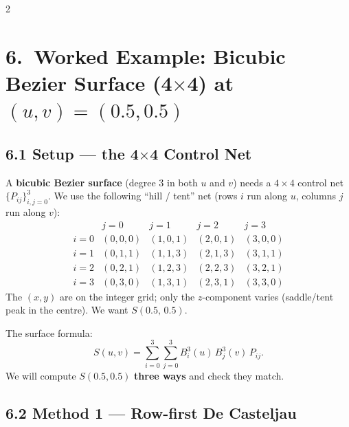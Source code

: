 
\begin{paracol}{2}

\section*{6.\ Worked Example: Bicubic Bezier Surface (4$\times$4) at $(u,v)=(0.5,0.5)$}

\subsection*{6.1 Setup --- the 4$\times$4 Control Net}

A \textbf{bicubic Bezier surface} (degree 3 in both $u$ and $v$) needs a $4\times 4$ control net $\{P_{ij}\}_{i,j=0}^{3}$. We use the following ``hill / tent'' net (rows $i$ run along $u$, columns $j$ run along $v$):
\[
\renewcommand{\arraystretch}{1.1}
\begin{array}{c|cccc}
 & j=0 & j=1 & j=2 & j=3 \\\hline
i{=}0 & (0,0,0) & (1,0,1) & (2,0,1) & (3,0,0) \\
i{=}1 & (0,1,1) & (1,1,3) & (2,1,3) & (3,1,1) \\
i{=}2 & (0,2,1) & (1,2,3) & (2,2,3) & (3,2,1) \\
i{=}3 & (0,3,0) & (1,3,1) & (2,3,1) & (3,3,0)
\end{array}
\]
The $(x,y)$ are on the integer grid; only the $z$-component varies (saddle/tent peak in the centre). We want $S(0.5,\,0.5)$.

The surface formula:
\[
S(u,v)=\sum_{i=0}^{3}\sum_{j=0}^{3} B_i^3(u)\,B_j^3(v)\,P_{ij}.
\]
We will compute $S(0.5,0.5)$ \textbf{three ways} and check they match.

\subsection*{6.2 Method 1 --- Row-first De Casteljau}


\end{paracol}
